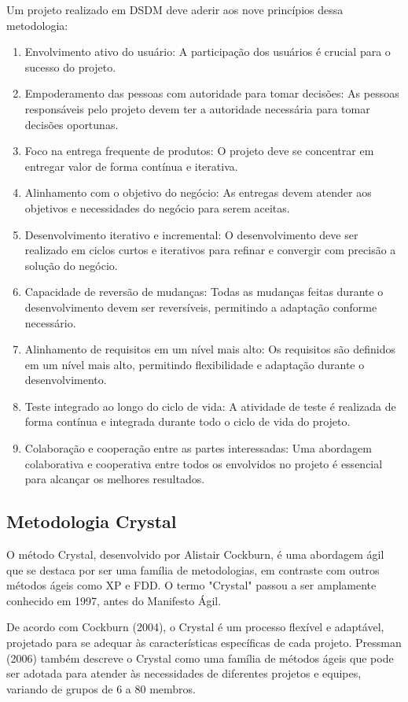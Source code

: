 Um projeto realizado em DSDM deve aderir aos nove princípios dessa metodologia:

\begin{enumerate}
	\item Envolvimento ativo do usuário: A participação dos usuários é crucial para o sucesso do projeto.
	\item Empoderamento das pessoas com autoridade para tomar decisões: As pessoas responsáveis pelo projeto devem ter a autoridade necessária para tomar decisões oportunas.
	\item Foco na entrega frequente de produtos: O projeto deve se concentrar em entregar valor de forma contínua e iterativa.
	\item Alinhamento com o objetivo do negócio: As entregas devem atender aos objetivos e necessidades do negócio para serem aceitas.
	\item Desenvolvimento iterativo e incremental: O desenvolvimento deve ser realizado em ciclos curtos e iterativos para refinar e convergir com precisão a solução do negócio.
	\item Capacidade de reversão de mudanças: Todas as mudanças feitas durante o desenvolvimento devem ser reversíveis, permitindo a adaptação conforme necessário.
	\item Alinhamento de requisitos em um nível mais alto: Os requisitos são definidos em um nível mais alto, permitindo flexibilidade e adaptação durante o desenvolvimento.
	\item Teste integrado ao longo do ciclo de vida: A atividade de teste é realizada de forma contínua e integrada durante todo o ciclo de vida do projeto.
	\item Colaboração e cooperação entre as partes interessadas: Uma abordagem colaborativa e cooperativa entre todos os envolvidos no projeto é essencial para alcançar os melhores resultados.

\end{enumerate}

\subsection{Metodologia Crystal}
O método Crystal, desenvolvido por Alistair Cockburn, é uma abordagem ágil que se destaca por ser uma família de metodologias, em contraste com outros métodos ágeis como XP e FDD. O termo "Crystal" passou a ser amplamente conhecido em 1997, antes do Manifesto Ágil.

De acordo com Cockburn (2004), o Crystal é um processo flexível e adaptável, projetado para se adequar às características específicas de cada projeto. Pressman (2006) também descreve o Crystal como uma família de métodos ágeis que pode ser adotada para atender às necessidades de diferentes projetos e equipes, variando de grupos de 6 a 80 membros.

